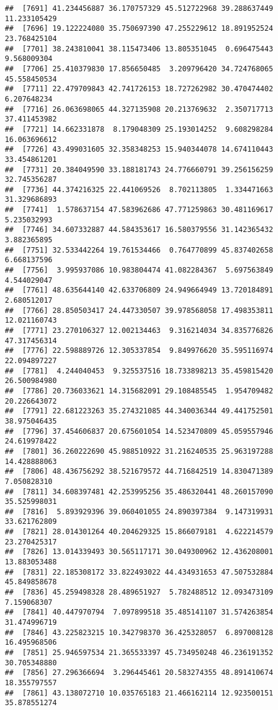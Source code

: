 \documentclass[
]{article}
\begin{document}
\begin{verbatim}
##  [7691] 41.234456887 36.170757329 45.512722968 39.288637449 11.233105429
##  [7696] 19.122224080 35.750697390 47.255229612 18.891952524 23.768425104
##  [7701] 38.243810041 38.115473406 13.805351045  0.696475443  9.568009304
##  [7706] 25.410379830 17.856650485  3.209796420 34.724768065 45.558450534
##  [7711] 22.479709843 42.741726153 18.727262982 30.470474402  6.207648234
##  [7716] 26.063698065 44.327135908 20.213769632  2.350717713 37.411453982
##  [7721] 14.662331878  8.179048309 25.193014252  9.608298284 16.063696612
##  [7726] 43.499031605 32.358348253 15.940344078 14.674110443 33.454861201
##  [7731] 20.384049590 33.188181743 24.776660791 39.256156259 32.745356287
##  [7736] 44.374216325 22.441069526  8.702113805  1.334471663 31.329686893
##  [7741]  1.578637154 47.583962686 47.771259863 30.481169617  5.235032993
##  [7746] 34.607332887 44.584353617 16.580379556 31.142365432  3.882365895
##  [7751] 32.533442264 19.761534466  0.764770899 45.837402658  6.668137596
##  [7756]  3.995937086 10.983804474 41.082284367  5.697563849  4.544029047
##  [7761] 48.635644140 42.633706809 24.949664949 13.720184891  2.680512017
##  [7766] 28.850503417 24.447330507 39.978568058 17.498353811 12.021160743
##  [7771] 23.270106327 12.002134463  9.316214034 34.835776826 47.317456314
##  [7776] 22.598889726 12.305337854  9.849976620 35.595116974 22.094897227
##  [7781]  4.244040453  9.325537516 18.733898213 35.459815420 26.500984980
##  [7786] 20.736033621 14.315682091 29.108485545  1.954709482 20.226643072
##  [7791] 22.681223263 35.274321085 44.340036344 49.441752501 38.975046435
##  [7796] 37.454606837 20.675601054 14.523470809 45.059557946 24.619978422
##  [7801] 36.260222690 45.988510922 31.216240535 25.963197288 14.428888063
##  [7806] 48.436756292 38.521679572 44.716842519 14.830471389  7.050828310
##  [7811] 34.608397481 42.253995256 35.486320441 48.260157090 35.525998031
##  [7816]  5.893929396 39.060401055 24.890397384  9.147319931 33.621762809
##  [7821] 28.014301264 40.204629325 15.866079181  4.622214579 23.270425317
##  [7826] 13.014339493 30.565117171 30.049300962 12.436208001 13.883053488
##  [7831] 22.185308172 33.822493022 44.434931653 47.507532884 45.849858678
##  [7836] 45.259498328 28.489651927  5.782488512 12.093473109  7.159068307
##  [7841] 40.447970794  7.097899518 35.485141107 31.574263854 31.474996719
##  [7846] 43.225823215 10.342798370 36.425328057  6.897008128 16.495968506
##  [7851] 25.946597534 21.365533397 45.734950248 46.236191352 30.705348880
##  [7856] 27.296366694  3.296445461 20.583274355 48.891410674 18.355797557
##  [7861] 43.138072710 10.035765183 21.466162114 12.923500151 35.878551274

\end{verbatim}
\end{document}
